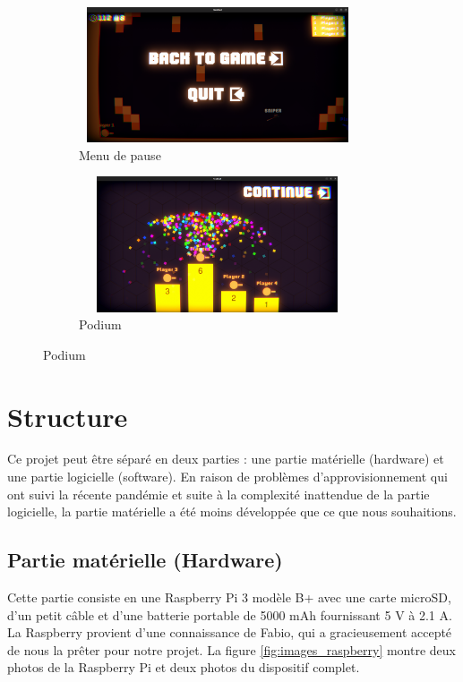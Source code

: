 \documentclass[a4paper]{article}
\begin{document}
\begin{figure}[h]
    \begin{subfigure}{0.5\textwidth}
        \includegraphics[width=0.9\textwidth, height = 4cm]{images/game/pause_menu.png}
        \caption{Menu de pause}
        \label{fig:pause_menu}
    \end{subfigure}
        \begin{subfigure}{0.5\textwidth}
        \includegraphics[width=0.9\textwidth, height = 4cm]{images/game/podium.png}
        \caption{Podium}
        \label{fig:podium}
    \end{subfigure}
\end{figure}

\section{Structure}
Ce projet peut être séparé en deux parties : une partie matérielle (hardware) et une partie logicielle (software). En raison de problèmes d’approvisionnement qui ont suivi la récente pandémie et suite à la complexité inattendue de la partie logicielle, la partie matérielle a été moins développée que ce que nous souhaitions.

\subsection{Partie matérielle (Hardware)}
Cette partie consiste en une Raspberry Pi 3 modèle B+ avec une carte microSD, d’un petit câble et d’une batterie portable de 5000 mAh fournissant 5 V à 2.1 A. La Raspberry provient d’une connaissance de Fabio, qui a gracieusement accepté de nous la prêter pour notre projet.
La figure \ref{fig:images_raspberry} montre deux photos de la Raspberry Pi et deux photos du dispositif complet.
\end{document}
